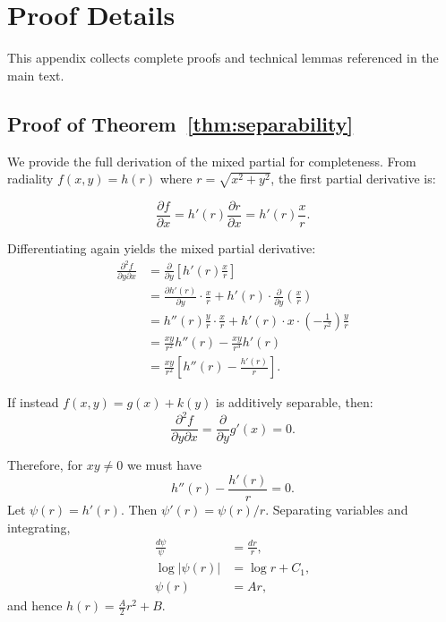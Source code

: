 \documentclass[twoside,11pt]{article}
\begin{document}

\appendix

\section{Proof Details}
\label{app:proofs}

This appendix collects complete proofs and technical lemmas referenced in the main text.

\subsection{Proof of Theorem~\ref{thm:separability}}

We provide the full derivation of the mixed partial for completeness. From radiality $f(x,y) = h(r)$ where $r = \sqrt{x^2 + y^2}$, the first partial derivative is:

\[
	\frac{\partial f}{\partial x} = h'(r) \frac{\partial r}{\partial x} = h'(r) \frac{x}{r}.
\]

Differentiating again yields the mixed partial derivative:
\begin{align}
	\frac{\partial^2 f}{\partial y \partial x} & = \frac{\partial}{\partial y}\left[ h'(r) \frac{x}{r} \right]                                                           \\
	                                           & = \frac{\partial h'(r)}{\partial y} \cdot \frac{x}{r} + h'(r) \cdot \frac{\partial}{\partial y}\left(\frac{x}{r}\right) \\
	                                           & = h''(r) \frac{y}{r} \cdot \frac{x}{r} + h'(r) \cdot x \cdot \left(-\frac{1}{r^2}\right) \frac{y}{r}                    \\
	                                           & = \frac{xy}{r^2} h''(r) - \frac{xy}{r^3} h'(r)                                                                          \\
	                                           & = \frac{xy}{r^2} \left[ h''(r) - \frac{h'(r)}{r} \right].
\end{align}

If instead $f(x,y) = g(x) + k(y)$ is additively separable, then:
\[
	\frac{\partial^2 f}{\partial y \partial x} = \frac{\partial}{\partial y} g'(x) = 0.
\]

Therefore, for $xy \neq 0$ we must have
\[
	h''(r) - \frac{h'(r)}{r} = 0.
\]
Let $\psi(r) = h'(r)$. Then $\psi'(r) = \psi(r)/r$. Separating variables and integrating,
\begin{align*}
	\frac{d\psi}{\psi} & = \frac{dr}{r}, \\
	\log|\psi(r)|      & = \log r + C_1, \\
	\psi(r)            & = Ar,
\end{align*}
and hence $h(r) = \frac{A}{2}r^2 + B$.
\end{document}
